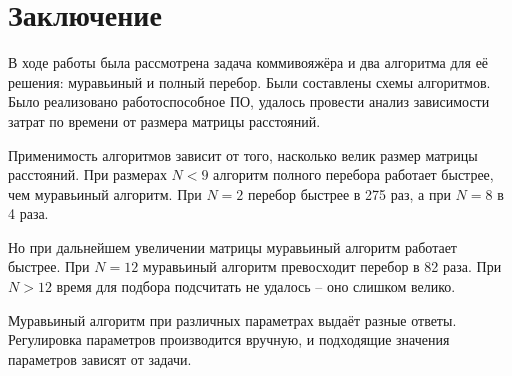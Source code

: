 \chapter{Заключение}
В ходе работы была рассмотрена задача коммивояжёра и два алгоритма для её решения: муравьиный и полный перебор.
Были составлены схемы алгоритмов.
Было реализовано работоспособное ПО, удалось провести анализ зависимости затрат по времени от размера матрицы расстояний.

Применимость алгоритмов зависит от того, насколько велик размер матрицы расстояний.
При размерах $ N < 9 $ алгоритм полного перебора работает быстрее, чем муравьиный алгоритм.
При $ N = 2 $ перебор быстрее в 275 раз, а при $ N = 8 $ в 4 раза.

Но при дальнейшем увеличении матрицы муравьиный алгоритм работает быстрее.
При $ N = 12 $ муравьиный алгоритм превосходит перебор в 82 раза.
При $ N > 12 $ время для подбора подсчитать не удалось -- оно слишком велико.

Муравьиный алгоритм при различных параметрах выдаёт разные ответы.
Регулировка параметров производится вручную, и подходящие значения параметров зависят от задачи.